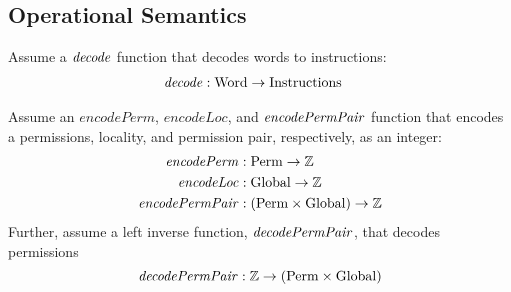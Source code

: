 \documentclass[a4paper]{article}
\newcommand{\fun}{\rightarrow}
\newcommand\dominique[1]{{\color{purple} \sf \footnotesize {DD: #1}}\\}
\renewcommand\dominique[1]{}
\newcommand{\plainfun}[2]{
  \ifthenelse{\equal{#2}{}}
  {\mathit{#1}}
  {\mathit{#1}(#2)}
}
\newcommand{\decode}{\plainfun{decode}{}}
\newcommand{\encodePerm}{\mathit{encodePerm}}
\newcommand{\encodePermPair}{\plainfun{encodePermPair}{}}
\newcommand{\encodeLoc}{\mathit{encodeLoc}{}}
\newcommand{\decodePermPair}{\plainfun{decodePermPair}}
\newcommand{\plaindom}[1]{\mathrm{#1}}
\newcommand{\Words}{\plaindom{Word}}
\newcommand{\Instrs}{\plaindom{Instructions}}
\newcommand{\ints}{\mathbb{Z}}
\newcommand{\Perms}{\plaindom{Perm}}
\newcommand{\Globals}{\plaindom{Global}}
\begin{document}
\subsection{Operational Semantics}
Assume a $\decode$ function that decodes words to instructions:
\begin{align*}
  \decode &:\Words \fun \Instrs
\end{align*}
\dominique{mention that it is a simplification to take decode total?}
Assume an $\encodePerm$, $\encodeLoc$, and $\encodePermPair$ function that encodes a permissions, locality, and permission pair, respectively, as an integer:
\begin{align*}
  \encodePerm &: \Perms \fun \ints \\
  \encodeLoc &: \Globals \fun \ints \\
  \encodePermPair &: (\Perms \times \Globals) \fun \ints \\
\end{align*}
Further, assume a left inverse function, $\decodePermPair{}$, that decodes permissions
\[
  \decodePermPair{} : \ints \fun (\Perms \times \Globals)
\]
\end{document}
